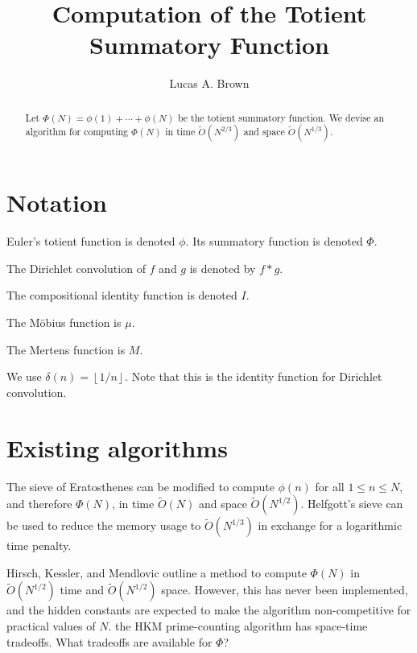 \documentclass[12pt]{article}
\title{Computation of the Totient Summatory Function}
\author{Lucas A. Brown}
\date{\currentdatetime}
\newcommand{\floor}[1]{{\left\lfloor #1 \right\rfloor}}
\begin{document}
\maketitle %

\begin{abstract}
Let $\Phi(N) = \phi(1) + \cdots + \phi(N)$ be the totient summatory function.  We devise an algorithm for computing $\Phi(N)$ in time $\widetilde{O}(N^{2/3})$ and space $\widetilde{O}(N^{1/3})$.
\end{abstract}

\section{Notation}

Euler's totient function is denoted $\phi$.  Its summatory function is denoted $\Phi$.

The Dirichlet convolution of $f$ and $g$ is denoted by $f*g$.

The compositional identity function is denoted $I$.

The M\"{o}bius function is $\mu$.

The Mertens function is $M$.

We use $\delta(n) = \floor{1/n}$.  Note that this is the identity function for Dirichlet convolution.

\section{Existing algorithms}

The sieve of Eratosthenes can be modified to compute $\phi(n)$ for all $1 \leq n \leq N$, and therefore $\Phi(N)$, in time $\widetilde{O}(N)$ and space $\widetilde{O}(N^{1/2})$.  Helfgott's sieve \cite{Helfgott2020} can be used to reduce the memory usage to $\widetilde{O}(N^{1/3})$ in exchange for a logarithmic time penalty.

Hirsch, Kessler, and Mendlovic outline \cite[\S5.6]{HKM2024} a method to compute $\Phi(N)$ in $\widetilde{O}(N^{1/2})$ time and $\widetilde{O}(N^{1/2})$ space.  However, this has never been implemented, and the hidden constants are expected to make the algorithm non-competitive for practical values of $N$.  \todo the HKM prime-counting algorithm has space-time tradeoffs.  What tradeoffs are available for $\Phi$?
\end{document}
